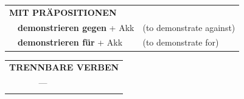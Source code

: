 \documentclass[10pt,a4paper]{revtex4-2}
\begin{document}
\begin{verbbox}
\vspace{10pt}

\begin{tabular}{lll}
\multicolumn{3}{l}{\textbf{MIT PRÄPOSITIONEN}}\\
& \textbf{demonstrieren gegen} + Akk & (to demonstrate against)\\
& \textbf{demonstrieren für} + Akk & (to demonstrate for)\\
\end{tabular}
\hfill
\begin{tabular}{lll}
\multicolumn{3}{l}{\textbf{TRENNBARE VERBEN}}\\
& ---\\
\vspace{10pt}
\end{tabular}

\vspace{-5pt}
\end{verbbox}
\end{document}
